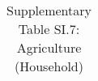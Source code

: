 \begin{longtable}{llcccccccccc}
\caption{Supplementary Table SI.7: Agriculture (Household)} \label{tab:pap__d4} \\                                                                                                                                                                                                                                                                                                                                                                                                                                                                                                                                                                                                                                                                                                                                                                                                        
\hline \hline                                                                                                                                                                                                                                                                                                                                                                                                                                                                                                                                                                                                                                                                                                                                                                                                                                                                             

\end{longtable}
